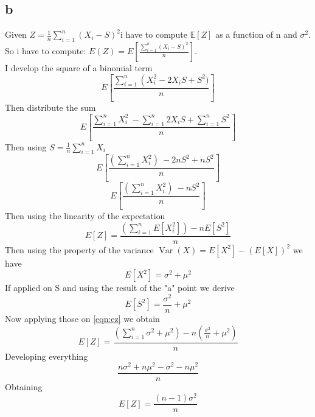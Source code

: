 \documentclass{article}
\begin{document}
\subsection{b}
Given $Z=\frac{1}{n} \sum_{i=1}^n\left(X_i-S\right)^2$i have to compute $\mathbb{E}[Z]$ as a function of n and $\sigma^2$.
So i have to compute: $E\left(Z\right)=E\left[\frac{\sum_{i=1}^n\left(X_i-S\right)^2}{n}\right]$.\\I develop the square of a binomial term$$E\left[\frac{\sum_{i=1}^n\left(X_i^2 -2X_i S +S^2)}{n}\right]$$
Then distribute the sum
$$E\left[\frac{\sum_{i=1}^n X_i^2 \ -\sum_{i=1}^n 2X_i S +\sum_{i=1}^n S^2}{n}\right]$$
Then using $S=\frac{1}{n} \sum_{i=1}^n X_i$
$$E\left[\frac{(\sum_{i=1}^n X_i^2) \ -2 nS^2 + nS^2}{n}\right]$$
$$E\left[\frac{(\sum_{i=1}^n X_i^2) \ - nS^2 }{n}\right]$$
Then using the linearity of the expectation
\begin{equation}
\label{eqn:ez}
    E[Z]=\frac{(\sum_{i=1}^nE[ X_i^2]) - nE[S^2]}{n}
\end{equation}
Then using the property of the variance $\operatorname{Var}(X)=E\left[X^2\right]-(E[X])^2$
we have $$E[X^2]=\sigma^2+\mu^2$$
If applied on S and using the result of the "a" point we derive
$$E[S^2]=\frac{\sigma^2}{n}+\mu^2$$
Now applying those on \ref{eqn:ez} we obtain
$$E[Z]=\frac{(\sum_{i=1}^n\sigma^2+\mu^2) - n(\frac{\sigma^2}{n}+\mu^2)}{n}$$
Developing everything
$$\frac{n\sigma^2+n\mu^2 - \sigma^2-n\mu^2}{n}$$
Obtaining
$$E[Z]=\frac{(n-1)\sigma^2}{n}$$
\end{document}
